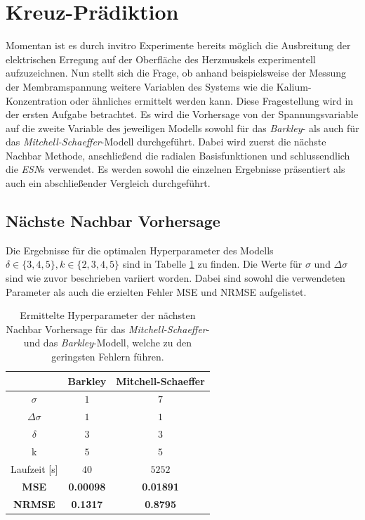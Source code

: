 \section{Kreuz-Prädiktion}
\label{sec:exp_cross_pred}
Momentan ist es durch invitro Experimente bereits möglich die Ausbreitung der elektrischen Erregung auf der Oberfläche des Herzmuskels experimentell aufzuzeichnen. Nun stellt sich die Frage, ob anhand beispielsweise der Messung der Membramspannung weitere Variablen des Systems wie die Kalium-Konzentration oder ähnliches ermittelt werden kann. Diese Fragestellung wird in der ersten Aufgabe betrachtet. Es wird die Vorhersage von der Spannungsvariable auf die zweite Variable des jeweiligen Modells sowohl für das \textit{Barkley}- als auch für das \textit{Mitchell-Schaeffer}-Modell durchgeführt. Dabei wird zuerst die nächste Nachbar Methode, anschließend die radialen Basisfunktionen und schlussendlich die \textit{ESN}s verwendet. Es werden sowohl die einzelnen Ergebnisse präsentiert als auch ein abschließender Vergleich durchgeführt.
 
\subsection{Nächste Nachbar Vorhersage}
Die Ergebnisse für die optimalen Hyperparameter des Modells $\delta \in \{3,4,5\}, k \in \{2, 3, 4, 5\}$ sind in Tabelle \ref{tab:exp_cross_nn_results} zu finden. Die Werte für $\sigma$ und $\Delta \sigma$ sind wie zuvor beschrieben variiert worden. Dabei sind sowohl die verwendeten Parameter als auch die erzielten Fehler MSE und NRMSE aufgelistet.
\begin{table}[h]
	\centering

	\begin{tabular}{ccc}
		\hline		
		\multicolumn{1}{c}{} & Barkley & Mitchell-Schaeffer \\ 
		\hline 
		\rule[-1ex]{0pt}{2.5ex} $\sigma$ & $1$ & $7$ \\ 
		\rule[-1ex]{0pt}{2.5ex} $\Delta \sigma$ & $1$ & $1$ \\ 
		\rule[-1ex]{0pt}{2.5ex} $\delta$ & $3$ & $3$ \\ 
		\rule[-1ex]{0pt}{2.5ex} k & $5$ & $5$ \\ 
		\rule[-1ex]{0pt}{2.5ex} Laufzeit [s] & $40$ & $5252$ \\ 
		\rule[-1ex]{0pt}{2.5ex} \textbf{MSE} & \textbf{0.00098} & \textbf{0.01891} \\ 
		\rule[-1ex]{0pt}{2.5ex} \textbf{NRMSE} & \textbf{0.1317} & \textbf{0.8795} \\ 
		\hline 
	\end{tabular} 

	\caption{Ermittelte Hyperparameter der nächsten Nachbar Vorhersage für das \textit{Mitchell-Schaeffer}- und das \textit{Barkley}-Modell, welche zu den geringsten Fehlern führen.}
\label{tab:exp_cross_nn_results}
\end{table} 

